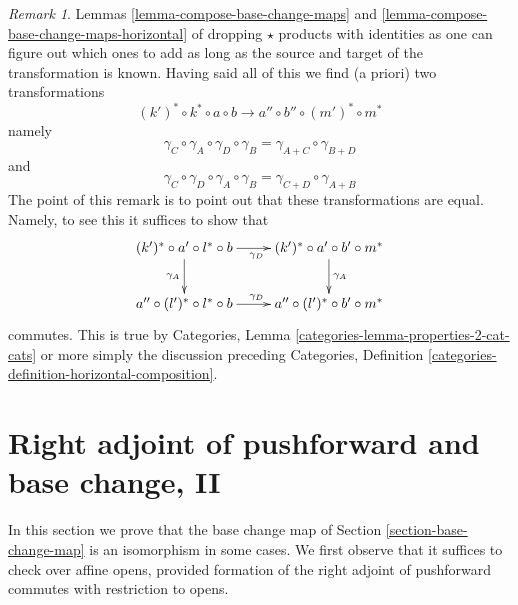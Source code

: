 \documentclass{stacks-project}
\theoremstyle{plain}
\theoremstyle{definition}
\theoremstyle{remark}
\newtheorem{remark}[subsection]{Remark}
\numberwithin{equation}{subsection}
\begin{document}
\begin{remark}
Lemmas \ref{lemma-compose-base-change-maps} and
\ref{lemma-compose-base-change-maps-horizontal}
of dropping $\star$ products with identities as one can figure
out which ones to add as long as the source and target of the
transformation is known.
Having said all of this we find (a priori) two transformations
$$
(k')^* \circ k^* \circ a \circ b
\longrightarrow
a'' \circ b'' \circ (m')^* \circ m^*
$$
namely
$$
\gamma_C \circ \gamma_A \circ \gamma_D \circ \gamma_B =
\gamma_{A + C} \circ \gamma_{B + D}
$$
and
$$
\gamma_C \circ \gamma_D \circ \gamma_A \circ \gamma_B =
\gamma_{C + D} \circ \gamma_{A + B}
$$
The point of this remark is to point out that these transformations
are equal. Namely, to see this it suffices to show that
$$
\xymatrix{
(k')^* \circ a' \circ l^* \circ b \ar[r]_{\gamma_D} \ar[d]_{\gamma_A} &
(k')^* \circ a' \circ b' \circ m^* \ar[d]^{\gamma_A} \\
a'' \circ (l')^* \circ l^* \circ b \ar[r]^{\gamma_D} &
a'' \circ (l')^* \circ b' \circ m^*
}
$$
commutes. This is true by
Categories, Lemma \ref{categories-lemma-properties-2-cat-cats}
or more simply the discussion preceding
Categories, Definition \ref{categories-definition-horizontal-composition}.
\end{remark}







\section{Right adjoint of pushforward and base change, II}
\label{section-base-change-II}

\noindent
In this section we prove that the base change map of
Section \ref{section-base-change-map} is an isomorphism
in some cases. We first observe that it suffices to check
over affine opens, provided formation of the right adjoint
of pushforward commutes with restriction to opens.
\end{document}
